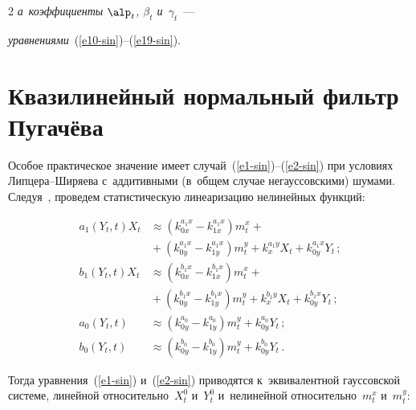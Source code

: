 \begin{multicols}{2}
\textit{а~коэффициенты $\alp_t$, $\beta_t$ и~$\gamma_t$}~---

\textit{уравнениями}~(\ref{e10-sin})--(\ref{e19-sin}).





\section{Квазилинейный нормальный фильтр Пугачёва}





Особое практическое значение имеет случай~(\ref{e1-sin})--(\ref{e2-sin}) при условиях Лип\-це\-ра--Ши\-ря\-ева с~аддитивными (в~общем случае негауссовскими) шумами. Следуя~\cite{1-sin}, проведем статистическую линеаризацию нелинейных функций:

    \begin{align*}

    a_1 \left(Y_t, t\right) X_t &\approx \left(k_{0x}^{a_1 x} - k_{1x}^{a_1 x}\right) m_t^x +{}\\

     &{}+\left( k_{0y}^{a_1 x} - k_{1y}^{a_1 x}\right) m_t^y + k_x^{a_1 y} X_t + k_{0y}^{a_1 x} Y_t\,;

   \\

    b_1 \left(Y_t, t\right) X_t &\approx \left(k_{0x}^{b_1 x} - k_{1x}^{b_1 x}\right) m_t^x + {}\\

    &{}+\left( k_{0y}^{b_1 x} - k_{1y}^{b_1 x}\right) m_t^y + k_x^{b_1 y} X_t + k_{0y}^{b_1 x} Y_t\,;

   \\

    a_0 (Y_t , t) &\approx \left( k_{0y}^{a_0} - k_{1y}^{a_0}\right) m_t^y + k_{0y}^{a_0} Y_t\,;\\

    b_0 \left(Y_t , t\right) &\approx  \left( k_{0y}^{b_0} - k_{1y}^{b_0}\right) m_t^y + k_{0y}^{b_0} Y_t\,.


    \end{align*}

Тогда уравнения~(\ref{e1-sin}) и~(\ref{e2-sin}) приводятся к~эквивалентной гауссовской системе, линейной относительно~$X_t^0$ и~$Y_t^0$ и~нелинейной относительно~$m_t^x$ и~$m_t^y$:

\begin{align}


\end{align}
\end{multicols}
